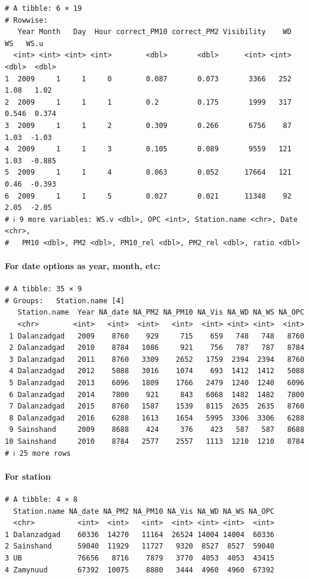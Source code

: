\documentclass[
]{agujournal2019}
\let\oldparagraph\paragraph
\renewcommand{\paragraph}[1]{\oldparagraph{#1}\mbox{}}
\begin{document}
\begin{verbatim}
# A tibble: 6 × 19
# Rowwise: 
   Year Month   Day  Hour correct_PM10 correct_PM2 Visibility    WD    WS   WS.u
  <int> <int> <int> <int>        <dbl>       <dbl>      <int> <int> <dbl>  <dbl>
1  2009     1     1     0        0.087       0.073       3366   252 1.08   1.02 
2  2009     1     1     1        0.2         0.175       1999   317 0.546  0.374
3  2009     1     1     2        0.309       0.266       6756    87 1.03  -1.03 
4  2009     1     1     3        0.105       0.089       9559   121 1.03  -0.885
5  2009     1     1     4        0.063       0.052      17664   121 0.46  -0.393
6  2009     1     1     5        0.027       0.021      11348    92 2.05  -2.05 
# ℹ 9 more variables: WS.v <dbl>, OPC <int>, Station.name <chr>, Date <chr>,
#   PM10 <dbl>, PM2 <dbl>, PM10_rel <dbl>, PM2_rel <dbl>, ratio <dbl>
\end{verbatim}

\paragraph{For date options as year, month,
etc:}\label{for-date-options-as-year-month-etc}

\begin{verbatim}
# A tibble: 35 × 9
# Groups:   Station.name [4]
   Station.name  Year NA_date NA_PM2 NA_PM10 NA_Vis NA_WD NA_WS NA_OPC
   <chr>        <int>   <int>  <int>   <int>  <int> <int> <int>  <int>
 1 Dalanzadgad   2009    8760    929     715    659   748   748   8760
 2 Dalanzadgad   2010    8784   1086     921    756   787   787   8784
 3 Dalanzadgad   2011    8760   3309    2652   1759  2394  2394   8760
 4 Dalanzadgad   2012    5088   3016    1074    693  1412  1412   5088
 5 Dalanzadgad   2013    6096   1809    1766   2479  1240  1240   6096
 6 Dalanzadgad   2014    7800    921     843   6068  1482  1482   7800
 7 Dalanzadgad   2015    8760   1587    1539   8115  2635  2635   8760
 8 Dalanzadgad   2016    6288   1613    1654   5995  3306  3306   6288
 9 Sainshand     2009    8688    424     376    423   587   587   8688
10 Sainshand     2010    8784   2577    2557   1113  1210  1210   8784
# ℹ 25 more rows
\end{verbatim}

\paragraph{For station}\label{for-station}

\begin{verbatim}
# A tibble: 4 × 8
  Station.name NA_date NA_PM2 NA_PM10 NA_Vis NA_WD NA_WS NA_OPC
  <chr>          <int>  <int>   <int>  <int> <int> <int>  <int>
1 Dalanzadgad    60336  14270   11164  26524 14004 14004  60336
2 Sainshand      59040  11929   11727   9320  8527  8527  59040
3 UB             76656   8716    7879   3770  4053  4053  43415
4 Zamynuud       67392  10075    8880   3444  4960  4960  67392
\end{verbatim}
\end{document}
